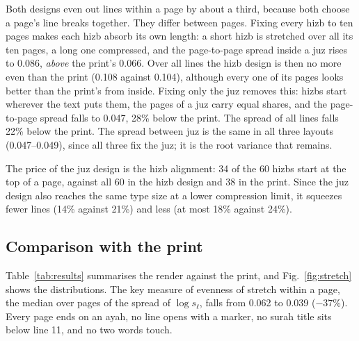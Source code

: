 \documentclass[sigconf,nonacm]{acmart}
\begin{document}
Both designs even out lines within a page by about a third, because both choose a page's line breaks together. They differ between pages. Fixing every hizb to ten pages makes each hizb absorb its own length: a short hizb is stretched over all its ten pages, a long one compressed, and the page-to-page spread inside a juz rises to 0.086, \emph{above} the print's 0.066. Over all lines the hizb design is then no more even than the print (0.108 against 0.104), although every one of its pages looks better than the print's from inside. Fixing only the juz removes this: hizbs start wherever the text puts them, the pages of a juz carry equal shares, and the page-to-page spread falls to 0.047, 28\% below the print. The spread of all lines falls 22\% below the print. The spread between juz is the same in all three layouts (0.047--0.049), since all three fix the juz; it is the root variance that remains.

The price of the juz design is the hizb alignment: 34 of the 60 hizbs start at the top of a page, against all 60 in the hizb design and 38 in the print. Since the juz design also reaches the same type size at a lower compression limit, it squeezes fewer lines (14\% against 21\%) and less (at most 18\% against 24\%).

\subsection{Comparison with the print}
Table~\ref{tab:results} summarises the render against the print, and Fig.~\ref{fig:stretch} shows the distributions. The key measure of evenness of stretch within a page, the median over pages of the spread of $\log s_\ell$, falls from 0.062 to 0.039 ($-37\%$). Every page ends on an ayah, no line opens with a marker, no surah title sits below line 11, and no two words touch.
\end{document}
